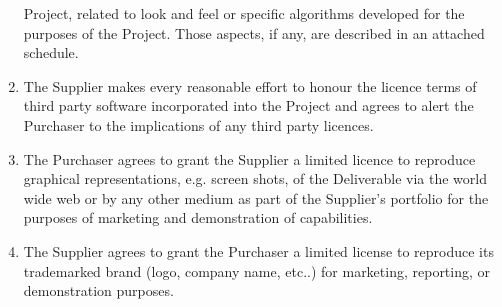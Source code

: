 \documentclass[nz-terms]{subfiles}
\begin{document}
\begin{enumerate}
Project, related to look and feel or specific algorithms developed for the
purposes of the Project. Those aspects, if any, are described in an attached
schedule.
\item The Supplier makes every reasonable effort to honour the licence terms of
third party software incorporated into the Project and agrees to alert the
Purchaser to the implications of any third party licences.
\item The Purchaser agrees to grant the Supplier a limited licence to reproduce
graphical representations, e.g. screen shots, of the Deliverable via the
world wide web or by any other medium as part of the Supplier's portfolio for
the purposes of marketing and demonstration of capabilities.
\item The Supplier agrees to grant the Purchaser a limited license to reproduce
its trademarked brand (logo, company name, etc..) for marketing, reporting,
or demonstration purposes.
\end{enumerate}
\end{document}
